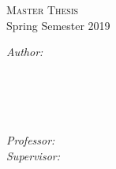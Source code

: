 \documentclass[
    11pt, %
    english, %
    onehalfspacing, %
    liststotoc, %
    parskip, %
    nohyperref, %
    headsepline, %
    chapterinoneline, %
    consistentlayout, %
]{MastersDoctoralThesis} %
\begin{document}
\begin{titlepage}
\begin{center}
\textsc{\Large Master Thesis}\\[0.1cm] %
{\small Spring Semester 2019}\\
\vfill
 
{\large\emph{Author: }\authorname}\\[0.5cm]
{\small \facname}\\[0.1cm]
{\small\deptname} \\[0.1cm]
{\small \univname} \\[0.1cm]
{\small \groupname}\\[0.1cm]
\vfill
 
 
{\large\emph{Professor: } \profname}\\[0.5cm]
{\large\emph{Supervisor: } \supname}\\

\vfill
 



\end{center}
\end{titlepage}
\end{document}
